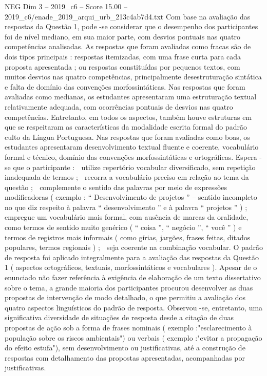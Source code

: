 \begin{textsample}{NEG Dim 3 – 2019\_c6 – Score 15.00 – 2019\_c6/enade\_2019\_arqui\_urb\_213c4ab7d4.txt}
Com base na avaliação das respostas da Questão 1, pode -se considerar que o desempenho dos participantes foi de nível mediano, em sua maior parte, com desvios pontuais nas quatro competências analisadas.
As respostas que foram avaliadas como fracas são de dois tipos principais : respostas itemizadas, com uma frase curta para cada proposta apresentada ; ou respostas constituídas por pequenos textos, com muitos desvios nas quatro competências, principalmente desestruturação sintática e falta de domínio das convenções morfossintáticas.
Nas respostas que foram avaliadas como medianas, os estudantes apresentaram uma estruturação textual relativamente adequada, com ocorrências pontuais de desvios nas quatro competências.
Entretanto, em todos os aspectos, também houve estruturas em que se respeitaram as características da modalidade escrita formal do padrão culto da Língua Portuguesa.
Nas respostas que foram avaliadas como boas, os estudantes apresentaram desenvolvimento textual fluente e coerente, vocabulário formal e técnico, domínio das convenções morfossintáticas e ortográficas.
Espera -se que o participante :  utilize repertório vocabular diversificado, sem repetição inadequada de termos ;  recorra a vocabulário preciso em relação ao tema da questão ;  complemente o sentido das palavras por meio de expressões modificadoras ( exemplo : “ Desenvolvimento de projetos ” – sentido incompleto no que diz respeito à palavra “ desenvolvimento ” e à palavra “ projetos ” ) ;  empregue um vocabulário mais formal, com ausência de marcas da oralidade, como termos de sentido muito genérico ( “ coisa ”, “ negócio ”, “ você ” ) e termos de registros mais informais ( como gírias, jargões, frases feitas, ditados populares, termos regionais ) ;  seja coerente na combinação vocabular.
O padrão de resposta foi aplicado integralmente para a avaliação das respostas da Questão 1 ( aspectos ortográficos, textuais, morfossintáticos e vocabulares ).
Apesar de o enunciado não fazer referência à exigência de elaboração de um texto dissertativo sobre o tema, a grande maioria dos participantes procurou desenvolver as duas propostas de intervenção de modo detalhado, o que permitiu a avaliação dos quatro aspectos linguísticos do padrão de resposta.
Observou -se, entretanto, uma significativa diversidade de situações de resposta desde a citação de duas propostas de ação sob a forma de frases nominais ( exemplo :"esclarecimento à população sobre os riscos ambientais") ou verbais ( exemplo :"evitar a propagação do efeito estufa"), sem desenvolvimento ou justificativas, até a construção de respostas com detalhamento das propostas apresentadas, acompanhadas por justificativas.

\end{textsample}
